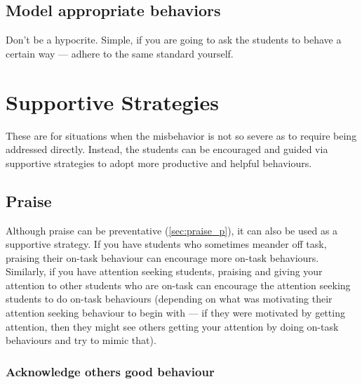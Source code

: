 \documentclass[12pt]{report}
\begin{document}
\section{Model appropriate behaviors}
\label{sec:model_behaviours_p}

Don't be a hypocrite. Simple, if you are going to ask the students to behave a certain way --- adhere to the same standard yourself.


























\chapter{Supportive Strategies}
\label{chap:supportive}

These are for situations when the misbehavior is not so severe as to require being addressed directly. Instead, the students can be encouraged and guided via supportive strategies to adopt more productive and helpful behaviours.


\section{Praise}
\label{sec:praise_s}

Although praise can be preventative (\ref{sec:praise_p}), it can also be used as a supportive strategy. If you have students who sometimes meander off task, praising their on-task behaviour can encourage more on-task behaviours. Similarly, if you have attention seeking students, praising and giving your attention to other students who are on-task can encourage the attention seeking students to do on-task behaviours (depending on what was motivating their attention seeking behaviour to begin with --- if they were motivated by getting attention, then they might see others getting your attention by doing on-task behaviours and try to mimic that). 

\subsection{Acknowledge others good behaviour}
\label{sec:acknowledge_good_behaviour_s}
\end{document}
